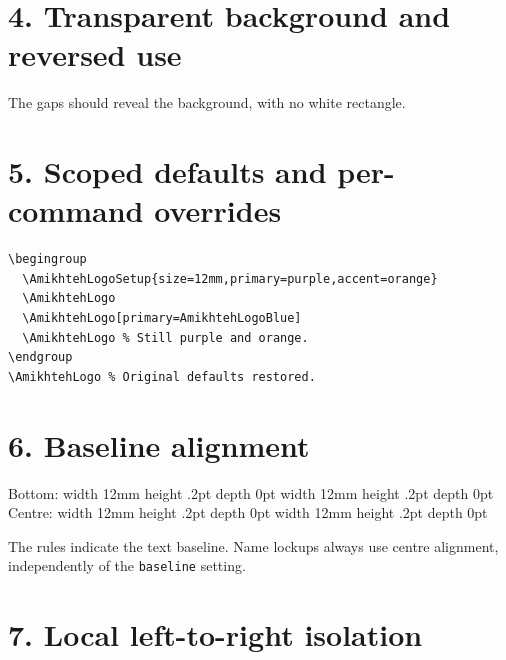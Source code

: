 \documentclass[a4paper,11pt]{article}
\begin{document}
\section*{4. Transparent background and reversed use}

\begingroup
\setlength{\fboxsep}{4mm}
\colorbox{black!8}{\AmikhtehLogo[size=18mm]}\quad
\colorbox{black!85}{%
  \color{white}%
}
\endgroup

The gaps should reveal the background, with no white rectangle.

\newpage
\section*{5. Scoped defaults and per-command overrides}

\begingroup
  \par
  \par
\endgroup
\par
{}

\begin{verbatim}
\begingroup
  \AmikhtehLogoSetup{size=12mm,primary=purple,accent=orange}
  \AmikhtehLogo
  \AmikhtehLogo[primary=AmikhtehLogoBlue]
  \AmikhtehLogo % Still purple and orange.
\endgroup
\AmikhtehLogo % Original defaults restored.
\end{verbatim}

\section*{6. Baseline alignment}

Bottom:\quad
\vrule width 12mm height .2pt depth 0pt
\AmikhtehLogo[size=12mm,baseline=bottom]%
\vrule width 12mm height .2pt depth 0pt
\qquad
Centre:\quad
\vrule width 12mm height .2pt depth 0pt
\AmikhtehLogo[size=12mm,baseline=center]%
\vrule width 12mm height .2pt depth 0pt

The rules indicate the text baseline. Name lockups always use
centre alignment, independently of the \texttt{baseline} setting.

\section*{7. Local left-to-right isolation}
\end{document}
